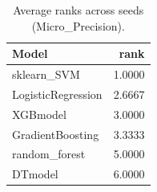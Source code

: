 \begin{table}[t]
\centering
\begin{tabular}{lr}
\toprule
Model & rank \\
\midrule
sklearn_SVM & 1.0000 \\
LogisticRegression & 2.6667 \\
XGBmodel & 3.0000 \\
GradientBoosting & 3.3333 \\
random_forest & 5.0000 \\
DTmodel & 6.0000 \\
\bottomrule
\end{tabular}
\caption{Average ranks across seeds (Micro_Precision).}
\label{tab:avg_rank_Micro_Precision}
\end{table}